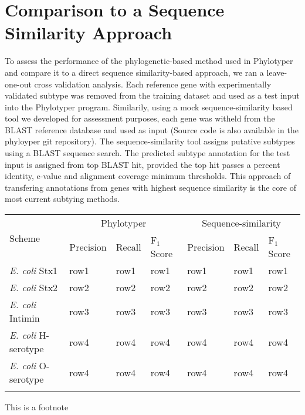\documentclass{bioinfo}
\begin{document}
\section{Comparison to a Sequence Similarity Approach}

To assess the performance of the phylogenetic-based method used in Phylotyper and compare it to a direct sequence similarity-based approach, we ran a leave-one-out cross validation analysis. 
Each reference gene with experimentally validated subtype was removed from the training dataset and used as a test input into the Phylotyper program. 
Similarily, using a mock sequence-similarity based tool we developed for assessment purposes, each gene was witheld from the BLAST reference database and used as input (Source code is also available in the phyloyper git repository).
The sequence-similarity tool assigns putative subtypes using a BLAST sequence search.  
The predicted subtype annotation for the test input is assigned from top BLAST hit, provided the top hit passes a percent identity, e-value and alignment coverage minimum thresholds.  
This approach of transfering annotations from genes with highest sequence similarity is the core of most current subtying methods.


\begin{table}[!t]
 {
\begin{tabular}{@{\extracolsep{2pt}}lllllll@{}}
\toprule 
\multirow{2}{*}{Scheme} & \multicolumn{3}{c}{Phylotyper} & \multicolumn{3}{c}{Sequence-similarity}\\
\cline{2-4}\cline{5-7}
& Precision & Recall & F$_{1}$ Score & Precision & Recall & F$_{1}$ Score \\
\midrule
{\it E. coli} Stx1 & row1 & row1 & row1 & row1 & row1 & row1\\
{\it E. coli} Stx2 & row2 & row2 & row2 & row2 & row2 & row2\\
{\it E. coli} Intimin & row3 & row3 & row3 & row3 & row3 & row3\\
{\it E. coli} H-serotype & row4 & row4 & row4 & row4 & row4 & row4\\
{\it E. coli} O-serotype & row4 & row4 & row4 & row4 & row4 & row4\\\botrule
\end{tabular}}{This is a footnote}
\end{table}
\end{document}
